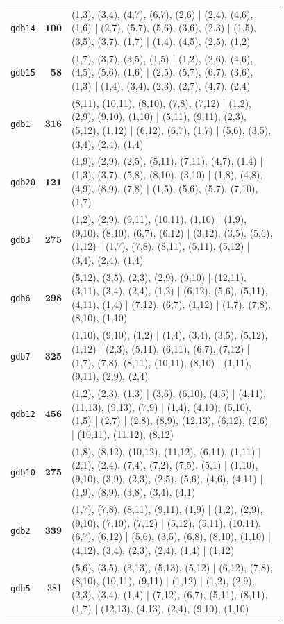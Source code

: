 \begin{landscape}
\begin{longtable}{lr>{\tiny\raggedright\arraybackslash}p{0.78\linewidth}}
\texttt{gdb14} & $\mathbf{100}$ & (1,3), (3,4), (4,7), (6,7), (2,6) | (2,4), (4,6), (1,6) | (2,7), (5,7), (5,6), (3,6), (2,3) | (1,5), (3,5), (3,7), (1,7) | (1,4), (4,5), (2,5), (1,2) \\[2pt]
\texttt{gdb15} & $\mathbf{58}$ & (1,7), (3,7), (3,5), (1,5) | (1,2), (2,6), (4,6), (4,5), (5,6), (1,6) | (2,5), (5,7), (6,7), (3,6), (1,3) | (1,4), (3,4), (2,3), (2,7), (4,7), (2,4) \\[2pt]
\texttt{gdb1} & $\mathbf{316}$ & (8,11), (10,11), (8,10), (7,8), (7,12) | (1,2), (2,9), (9,10), (1,10) | (5,11), (9,11), (2,3), (5,12), (1,12) | (6,12), (6,7), (1,7) | (5,6), (3,5), (3,4), (2,4), (1,4) \\[2pt]
\texttt{gdb20} & $\mathbf{121}$ & (1,9), (2,9), (2,5), (5,11), (7,11), (4,7), (1,4) | (1,3), (3,7), (5,8), (8,10), (3,10) | (1,8), (4,8), (4,9), (8,9), (7,8) | (1,5), (5,6), (5,7), (7,10), (1,7) \\[2pt]
\texttt{gdb3} & $\mathbf{275}$ & (1,2), (2,9), (9,11), (10,11), (1,10) | (1,9), (9,10), (8,10), (6,7), (6,12) | (3,12), (3,5), (5,6), (1,12) | (1,7), (7,8), (8,11), (5,11), (5,12) | (3,4), (2,4), (1,4) \\[2pt]
\texttt{gdb6} & $\mathbf{298}$ & (5,12), (3,5), (2,3), (2,9), (9,10) | (12,11), (3,11), (3,4), (2,4), (1,2) | (6,12), (5,6), (5,11), (4,11), (1,4) | (7,12), (6,7), (1,12) | (1,7), (7,8), (8,10), (1,10) \\[2pt]
\texttt{gdb7} & $\mathbf{325}$ & (1,10), (9,10), (1,2) | (1,4), (3,4), (3,5), (5,12), (1,12) | (2,3), (5,11), (6,11), (6,7), (7,12) | (1,7), (7,8), (8,11), (10,11), (8,10) | (1,11), (9,11), (2,9), (2,4) \\[2pt]
\texttt{gdb12} & $\mathbf{456}$ & (1,2), (2,3), (1,3) | (3,6), (6,10), (4,5) | (4,11), (11,13), (9,13), (7,9) | (1,4), (4,10), (5,10), (1,5) | (2,7) | (2,8), (8,9), (12,13), (6,12), (2,6) | (10,11), (11,12), (8,12) \\[2pt]
\texttt{gdb10} & $\mathbf{275}$ & (1,8), (8,12), (10,12), (11,12), (6,11), (1,11) | (2,1), (2,4), (7,4), (7,2), (7,5), (5,1) | (1,10), (9,10), (3,9), (2,3), (2,5), (5,6), (4,6), (4,11) | (1,9), (8,9), (3,8), (3,4), (4,1) \\[2pt]
\texttt{gdb2} & $\mathbf{339}$ & (1,7), (7,8), (8,11), (9,11), (1,9) | (1,2), (2,9), (9,10), (7,10), (7,12) | (5,12), (5,11), (10,11), (6,7), (6,12) | (5,6), (3,5), (6,8), (8,10), (1,10) | (4,12), (3,4), (2,3), (2,4), (1,4) | (1,12) \\[2pt]
\texttt{gdb5} & 381 & (5,6), (3,5), (3,13), (5,13), (5,12) | (6,12), (7,8), (8,10), (10,11), (9,11) | (1,12) | (1,2), (2,9), (2,3), (3,4), (1,4) | (7,12), (6,7), (5,11), (8,11), (1,7) | (12,13), (4,13), (2,4), (9,10), (1,10) \\[2pt]

\end{longtable}
\end{landscape}
